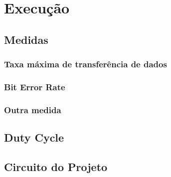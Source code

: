 	\chapter{Execução}\label{cap-execucao}
	
	\section{Medidas}
	
	\subsection{Taxa máxima de transferência de dados}
	
	\subsection{Bit Error Rate}
	
	\subsection{Outra medida}
	
	\section{Duty Cycle}
	
	\section{Circuito do Projeto}
	
	\lipsum[1]